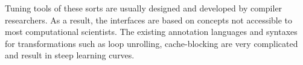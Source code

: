 Tuning tools of these sorts are usually designed and developed by compiler researchers. As a result, the interfaces are based on concepts not accessible to most computational scientists. The existing annotation languages and syntaxes for transformations such as loop unrolling, cache-blocking are very complicated and result in steep learning curves.